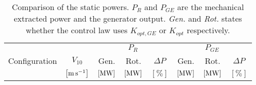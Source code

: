 \documentclass[11pt, a4paper]{article}
\begin{document}
\begin{table}[htb]
  \centering
  \caption{Comparison of the static powers. $P_R$ and $P_{GE}$ are the mechanical extracted power and the generator output. \textit{Gen.} and \textit{Rot.} states whether the control law uses $K_{opt,GE}$ or $K_{opt}$ respectively.}
  \begin{tabular}{cc|ccc|ccc}
    \toprule
    & & \multicolumn{3}{c|}{$P_R$} & \multicolumn{3}{c}{$P_{GE}$} \\
    Configuration & $V_{10}$ & Gen.  & Rot.& $\Delta P$  & Gen.  & Rot.& $\Delta P$ \\ 
    & $\left[\si{\meter\per\second}\right]$ & $\left[\si{\mega\watt}\right]$ & $\left[\si{\mega\watt}\right]$ & $\left[\%\right]$ & $\left[\si{\mega\watt}\right]$ & $\left[\si{\mega\watt}\right]$ & $\left[\%\right]$ \\  \midrule
     
     
  \end{tabular}
  \label{tab:comp_powers}
\end{table}
\end{document}
